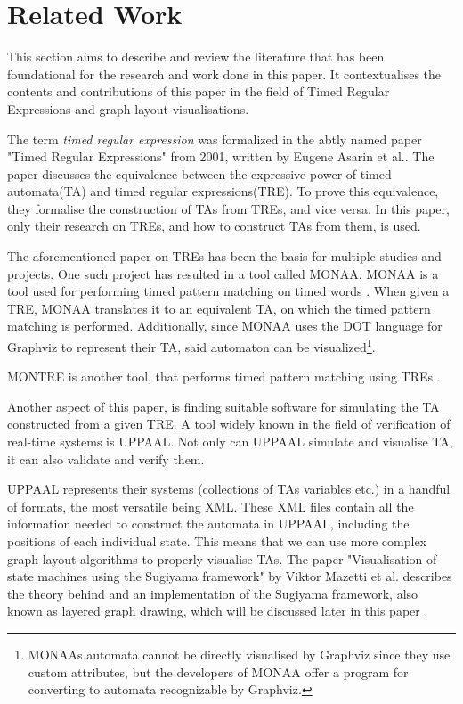 \section{Related Work}\label{sec:related work}



This section aims to describe and review the literature that has been foundational for the research and work done in this paper. It contextualises the contents and contributions of this paper in the field of Timed Regular Expressions and graph layout visualisations.

The term \textit{timed regular expression} was formalized in the abtly named paper "Timed Regular Expressions" from 2001, written by Eugene Asarin et al.\cite{Eugene2001}. The paper discusses the equivalence between the expressive power of timed automata(TA)\cite{ALUR1994} and timed regular expressions(TRE). To prove this equivalence, they formalise the construction of TAs from TREs, and vice versa. In this paper, only their research on TREs, and how to construct TAs from them, is used.

The aforementioned paper on TREs has been the basis for multiple studies and projects. One such project has resulted in a tool called MONAA. MONAA is a tool used for performing timed pattern matching on timed words \cite{MONAA2017}\cite{MONAAPAPER2018}. When given a TRE, MONAA translates it to an equivalent TA, on which the timed pattern matching is performed. Additionally, since MONAA uses the DOT language for Graphviz \cite{Graphviz} to represent their TA, said automaton can be visualized\footnote{MONAAs automata cannot be directly visualised by Graphviz since they use custom attributes, but the developers of MONAA offer a program for converting to automata recognizable by Graphviz\cite{MONAA2017}.}.

MONTRE is another tool, that performs timed pattern matching using TREs \cite{MONTRE2016}.

Another aspect of this paper, is finding suitable software for simulating the TA constructed from a given TRE. A tool widely known in the field of verification of real-time systems is UPPAAL. Not only can UPPAAL simulate and visualise TA, it can also validate and verify them\cite{UPPAAL}.

UPPAAL represents their systems (collections of TAs variables etc.) in a handful of formats, the most versatile being XML\cite{UPPAAL}. These XML files contain all the information needed to construct the automata in UPPAAL, including the positions of each individual state. This means that we can use more complex graph layout algorithms to properly visualise TAs. The paper "Visualisation of state machines using the Sugiyama framework" by Viktor Mazetti et al. describes the theory behind and an implementation of the Sugiyama framework, also known as layered graph drawing, which will be discussed later in this paper \cite{Mazetti2012}.